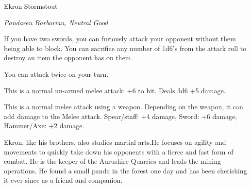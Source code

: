 \begin{monsterbox}{Ekron Stormstout}
	\begin{hangingpar}
		\textit{Pandaren Barbarian, Neutral Good}
	\end{hangingpar}
	\dndline%
	\basics[%
	armorclass = 17,
	hitpoints  = 172,
	speed      = 50 ft
	]
	\dndline%
	\stats[
	STR = \stat{20}, %
	DEX = \stat{18},
	CON = \stat{18},
	INT = \stat{12},
	WIS = \stat{12},
	CHA = \stat{16}
	]
	\dndline%
	\details[%
	languages = {Common, Elvish, Dwarvish, Gnomish, Halfling, Orc, Pandaren},
	challenge = 10
	]
	\dndline%
	\begin{monsteraction}
		If you have two swords, you can furiously attack your opponent without them being able to block. You can sacrifice any number of 1d6's from the attack roll to destroy an item the opponent has on them.
	\end{monsteraction}	
	\begin{monsteraction}
		You can attack twice on your turn.
	\end{monsteraction}
	\begin{monsteraction}[Melee]
	This is a normal un-armed melee attack: +6 to hit. Deals 3d6 +5 damage.
	\end{monsteraction}
	\begin{monsteraction}
		This is a normal melee attack using a weapon. Depending on the weapon, it can add damage to the Melee attack. Spear/staff: +4 damage, Sword: +6 damage, Hammer/Axe: +2 damage.
	\end{monsteraction}
	Ekron, like his brothers, also studies martial arts.He focuses on agility and movements to quickly take down his opponents with a fierce and fast form of combat. He is the keeper of the Aurushire Quarries and leads the mining operations. He found a small panda in the forest one day and has been cherishing it ever since as a friend and companion.
\end{monsterbox}

